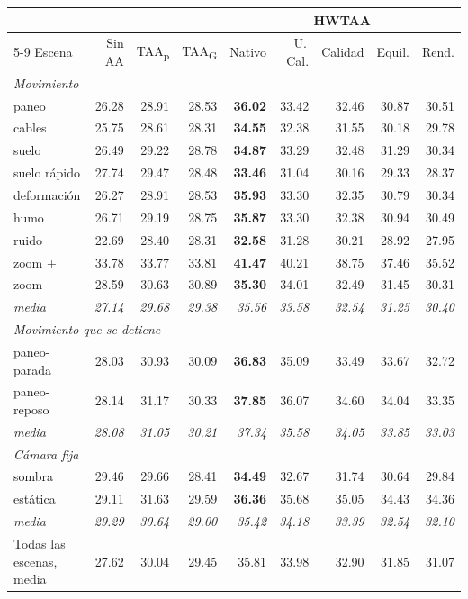 \begin{tabular}{lrrrrrrrr}
\toprule
 & \multicolumn{3}{c}{} & \multicolumn{5}{c}{HWTAA} \\
\cmidrule(lr){5-9}
Escena & Sin AA & TAA\textsubscript{p} & TAA\textsubscript{G} & Nativo & U.\,Cal. & Calidad & Equil. & Rend. \\
\midrule
\multicolumn{9}{l}{\textit{Movimiento}} \\
\quad paneo & 26.28 & 28.91 & 28.53 & \textbf{36.02} & 33.42 & 32.46 & 30.87 & 30.51 \\
\quad cables & 25.75 & 28.61 & 28.31 & \textbf{34.55} & 32.38 & 31.55 & 30.18 & 29.78 \\
\quad suelo & 26.49 & 29.22 & 28.78 & \textbf{34.87} & 33.29 & 32.48 & 31.29 & 30.34 \\
\quad suelo r\'apido & 27.74 & 29.47 & 28.48 & \textbf{33.46} & 31.04 & 30.16 & 29.33 & 28.37 \\
\quad deformaci\'on & 26.27 & 28.91 & 28.53 & \textbf{35.93} & 33.30 & 32.35 & 30.79 & 30.34 \\
\quad humo & 26.71 & 29.19 & 28.75 & \textbf{35.87} & 33.30 & 32.38 & 30.94 & 30.49 \\
\quad ruido & 22.69 & 28.40 & 28.31 & \textbf{32.58} & 31.28 & 30.21 & 28.92 & 27.95 \\
\quad zoom + & 33.78 & 33.77 & 33.81 & \textbf{41.47} & 40.21 & 38.75 & 37.46 & 35.52 \\
\quad zoom $-$ & 28.59 & 30.63 & 30.89 & \textbf{35.30} & 34.01 & 32.49 & 31.45 & 30.31 \\
\quad\textit{media} & \textit{27.14} & \textit{29.68} & \textit{29.38} & \textit{35.56} & \textit{33.58} & \textit{32.54} & \textit{31.25} & \textit{30.40} \\
\multicolumn{9}{l}{\textit{Movimiento que se detiene}} \\
\quad paneo-parada & 28.03 & 30.93 & 30.09 & \textbf{36.83} & 35.09 & 33.49 & 33.67 & 32.72 \\
\quad paneo-reposo & 28.14 & 31.17 & 30.33 & \textbf{37.85} & 36.07 & 34.60 & 34.04 & 33.35 \\
\quad\textit{media} & \textit{28.08} & \textit{31.05} & \textit{30.21} & \textit{37.34} & \textit{35.58} & \textit{34.05} & \textit{33.85} & \textit{33.03} \\
\multicolumn{9}{l}{\textit{C\'amara fija}} \\
\quad sombra & 29.46 & 29.66 & 28.41 & \textbf{34.49} & 32.67 & 31.74 & 30.64 & 29.84 \\
\quad est\'atica & 29.11 & 31.63 & 29.59 & \textbf{36.36} & 35.68 & 35.05 & 34.43 & 34.36 \\
\quad\textit{media} & \textit{29.29} & \textit{30.64} & \textit{29.00} & \textit{35.42} & \textit{34.18} & \textit{33.39} & \textit{32.54} & \textit{32.10} \\
\midrule
Todas las escenas, media & 27.62 & 30.04 & 29.45 & 35.81 & 33.98 & 32.90 & 31.85 & 31.07 \\
\bottomrule
\end{tabular}
